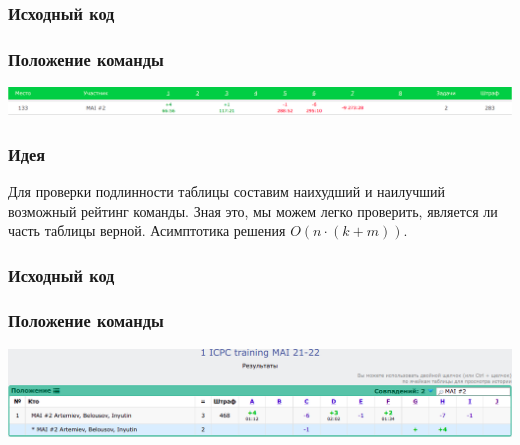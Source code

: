 \subsubsection*{Исходный код}

\subsubsection*{Положение команды}
\includegraphics[scale=0.25]{images/sib.png}\newline\noindent
\pagebreak


\subsubsection*{Идея}
Для проверки подлинности таблицы составим наихудший и наилучший возможный рейтинг команды. Зная это, мы можем легко проверить, является ли часть таблицы верной. Асимптотика решения $O(n \cdot (k + m))$.

\subsubsection*{Исходный код}

\subsubsection*{Положение команды}
\includegraphics[scale=0.25]{images/training1mai21.png}\newline\noindent
\pagebreak


